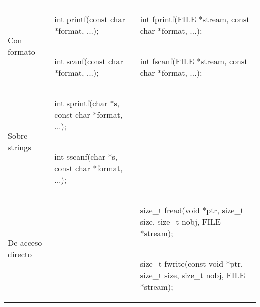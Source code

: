 \begin{table}[hbtp]
\begin{tabular}{l|l|l}
    \hline	
\multirow{2}{*}{Con formato}  	& 
\begin{codecell}
int printf(const 
char *format, ...);
\end{codecell}
	& 
\begin{codecell}
int fprintf(FILE *stream, 
const char *format, ...);
\end{codecell}
\\
    								&  
\begin{codecell}
int scanf(const 
char *format, ...);
\end{codecell}
   & 
\begin{codecell}
int fscanf(FILE *stream, 
const char *format, ...);
\end{codecell}
  \\
    \hline
\multirow{2}{*}{Sobre strings}  	& 
\begin{codecell}
int sprintf(char *s, const 
char *format, ...);
\end{codecell}
	&  \\
    								&   
\begin{codecell}
int sscanf(char *s, const 
char *format, ...);
\end{codecell}
   &    \\
    \hline
\multirow{2}{*}{De acceso directo}  	& 	& 
\begin{codecell}
size_t fread(void *ptr, size_t 
size, size_t nobj, FILE *stream);
\end{codecell}
\\
    								&      &  
\begin{codecell}
size_t fwrite(const void *ptr, 
size_t size, size_t nobj, 
FILE *stream);
\end{codecell}
\\
\end{tabular}
\end{table}


